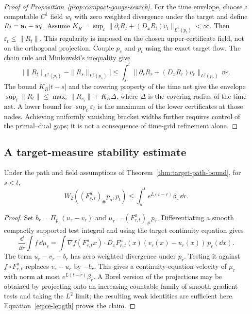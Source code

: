 \begin{proof}[Proof of Proposition~\ref{prop:compact-gauge-search}]
For the time envelope, choose a computable $C^1$ field $w_t$ with zero
weighted divergence under the target and define $R_t=\mathbf a_t-w_t$.
Assume $K_R=\sup_t\|\partial_tR_t+(D_xR_t)v_t\|_{L^2(p_t)}<\infty$.
Then $\varepsilon_t\le\|R_t\|$.  This regularity is imposed on the
chosen upper-certificate field, not on the orthogonal projection.
Couple $p_s$ and $p_t$ using the exact target flow.  The chain rule and
Minkowski's inequality give
\[
 \big|\|R_t\|_{L^2(p_t)}-\|R_s\|_{L^2(p_s)}\big|
 \le\int_s^t\|\partial_rR_r+(D_xR_r)v_r\|_{L^2(p_r)}\,\dd r.
\]
The bound $K_R|t-s|$ and the covering property of the time net give
the envelope $\sup_t\|R_t\|\le\max_i\|R_{s_i}\|+K_R\Delta$,
where $\Delta$ is the covering radius of the time net. A lower bound
for $\sup_t\varepsilon_t$ is the maximum of the lower certificates
at those nodes. Achieving uniformly vanishing bracket widths further
requires control of the primal--dual gaps; it is not a consequence of
time-grid refinement alone.
\end{proof}

\subsection{A target-measure stability estimate}

\begin{lemma}
\label{lem:projected-path-stability}
Under the path and field assumptions of Theorem~\ref{thm:target-path-bound},
for $s<t$,
\begin{equation}
 W_2((F^u_{s,t})_\#p_s,p_t)
 \le\int_s^t e^{L(t-r)}\beta_r\,\dd r.
 \label{eq:projected-path-stability}
\end{equation}
\end{lemma}

\begin{proof}
Set $b_r=\Pi_{p_r}(u_r-v_r)$ and
$\mu_r=(F^u_{r,t})_\#p_r$.  Differentiating a smooth compactly
supported test integral and using the target continuity equation gives
\[
 \frac{\dd}{\dd r}\int f\,\dd\mu_r
 =\int\nabla f(F^u_{r,t}x)\cdot
             D_xF^u_{r,t}(x)(v_r(x)-u_r(x))\,p_r(\dd x).
\]
The term $u_r-v_r-b_r$ has zero weighted divergence under $p_r$.
Testing it against $f\circ F^u_{r,t}$ replaces $v_r-u_r$ by $-b_r$.
This gives a continuity-equation velocity of $\mu_r$ with norm at most
$e^{L(t-r)}\beta_r$.  A Borel version of the projections may be
obtained by projecting onto an increasing countable family of smooth
gradient tests and taking the $L^2$ limit; the resulting weak identities
are sufficient here.  Equation~\eqref{eq:ce-length} proves the claim.
\end{proof}

